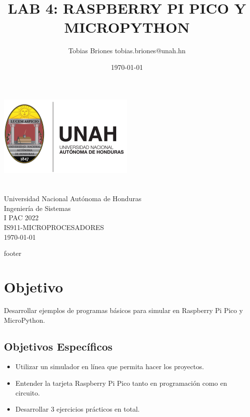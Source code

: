 \documentclass{article}
\title{LAB 4: RASPBERRY PI PICO Y MICROPYTHON}
\author{Tobias Briones \bigbreak tobias.briones@unah.hn}
\date{\today}
\begin{document}
    \makeatletter
    \begin{titlepage}
        \begin{center}
            \includegraphics[width=0.3\linewidth]{images/logo-unah}\\[4ex]
            {\huge \bfseries \@title
            \vspace{1cm}}\\[2ex]
            {\LARGE \@author}\\[50ex]

            {\large
            Universidad Nacional Autónoma de Honduras\\
            Ingeniería de Sistemas\\
            I PAC 2022\\
            IS911-MICROPROCESADORES
            }\\[2ex]

            {\large \today}
        \end{center}
    \end{titlepage}
    \makeatother
    \thispagestyle{empty}
    \newpage

    {footer}

    \section{Objetivo}

    Desarrollar ejemplos de programas básicos para simular en Raspberry Pi Pico y MicroPython.


    \subsection{Objetivos Específicos}\label{subsec:objetivos-específicos}

    \begin{itemize}
        \item Utilizar un simulador en línea que permita hacer los proyectos.
        \item Entender la tarjeta Raspberry Pi Pico tanto en programación como en circuito.
        \item Desarrollar $3$ ejercicios prácticos en total.
    \end{itemize}
\end{document}
